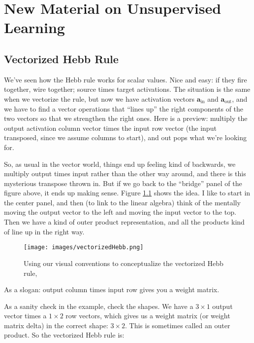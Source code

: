 \chapter{New Material on Unsupervised Learning}

\section{Vectorized Hebb Rule}

We've seen how the Hebb rule works for scalar values. Nice and easy: if they fire together, wire together; source times target activations. The situation is the same when we vectorize the rule, but now we have activation vectors $\mathbf{a}_{\text{in}}$ and $\mathbf{a}_{\text{out}}$, and we have to find a vector operations that ``lines up'' the right components of the two vectors so that we strengthen the right ones.  Here is a preview: multiply the output activation column vector times the input row vector (the input transposed, since we assume columns to start), and out pops what we're looking for. 

So, as usual in the vector world, things end up feeling kind of backwards, we multiply output times input rather than the other way around, and there is this mysterious transpose thrown in.  But if we go back to the ``bridge'' panel of the figure above, it ends up making sense. Figure \ref{vectorizedHebb} shows the idea. I like to start in the center panel, and then (to link to the linear algebra) think of the mentally moving the output vector to the left and moving the input vector to the top. Then we have a kind of outer product representation, and all the products kind of line up in the right way. 

\begin{figure}[h]
\centering
\texttt{[image: images/vectorizedHebb.png]}
\caption[Jeff Yoshimi.]{Using our visual conventions to conceptualize the vectorized Hebb rule,}
\label{vectorizedHebb}
\end{figure}

As a slogan: output column times input row gives you a weight matrix.

As a sanity check in the example, check the shapes. We have a $3 \times 1$ output vector times a $1 \times 2$ row vectors, which gives us a weight matrix (or weight matrix delta) in the correct shape: $3 \times 2$. This is sometimes called an outer product. So the vectorized Hebb rule is: 

